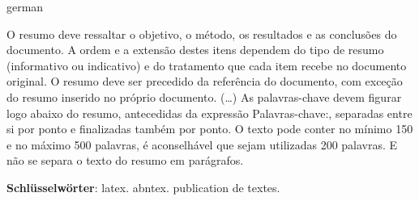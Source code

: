 

\begin{resumo}[Zusammenfassung]
\begin{otherlanguage*}{german}

O resumo deve ressaltar o objetivo, o método, os resultados e as conclusões do documento. A ordem e a extensão destes itens dependem do tipo de resumo (informativo ou indicativo) e do tratamento que cada item recebe no documento original. O resumo deve ser precedido da referência do documento, com exceção do resumo inserido no próprio documento. (\ldots) As palavras-chave devem figurar logo abaixo do resumo, antecedidas da expressão Palavras-chave:, separadas entre si por ponto e finalizadas também por ponto. O texto pode conter no mínimo 150 e no máximo 500 palavras, é aconselhável que sejam utilizadas 200 palavras. E não se separa o texto do resumo em parágrafos.


\vspace{\onelineskip}
\noindent
\textbf{Schlüsselwörter}: latex. abntex. publication de textes.
\end{otherlanguage*}
\end{resumo}